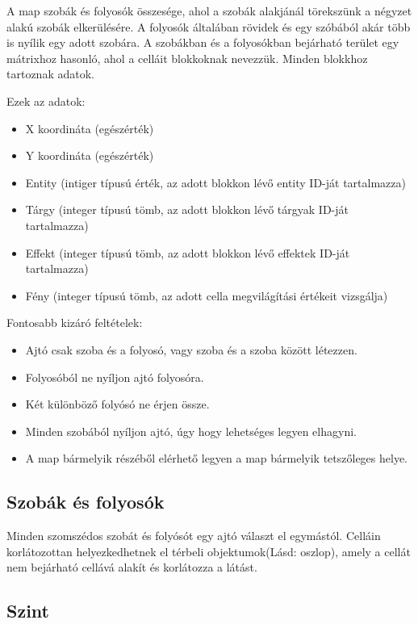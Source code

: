 A map szobák és folyosók összesége, ahol a szobák alakjánál törekszünk a négyzet alakú szobák elkerülésére. A folyosók általában rövidek és egy szóbából akár több is nyílik egy adott szobára.
A szobákban és a folyosókban bejárható terület egy mátrixhoz hasonló, ahol a celláit blokkoknak nevezzük.
Minden blokkhoz tartoznak adatok.

Ezek az adatok:

\begin{itemize}
    \item X koordináta (egészérték)
    \item Y koordináta (egészérték)
    \item Entity (intiger típusú érték,  az adott blokkon lévő entity ID-ját tartalmazza)
    \item Tárgy (integer típusú tömb, az adott blokkon lévő tárgyak ID-ját tartalmazza)
    \item Effekt (integer típusú tömb, az adott blokkon lévő effektek ID-ját tartalmazza)
    \item Fény (integer típusú tömb, az adott cella megvilágítási értékeit vizsgálja)
\end{itemize}

Fontosabb kizáró feltételek:

\begin{itemize}
    \item Ajtó csak szoba és a folyosó, vagy szoba és a szoba között létezzen.
    \item Folyosóból ne nyíljon ajtó folyosóra.
    \item Két különböző folyósó ne érjen össze.
    \item Minden szobából nyíljon ajtó, úgy hogy lehetséges legyen elhagyni.
    \item A map bármelyik részéből elérhető legyen a map bármelyik tetszőleges helye.
\end{itemize}

\subsection{Szobák és folyosók}

Minden szomszédos szobát és folyósót egy ajtó választ el egymástól.
Celláin korlátozottan helyezkedhetnek el térbeli objektumok(Lásd: oszlop), amely a cellát nem bejárható cellává alakít és korlátozza a látást.


\subsection{Szint}

